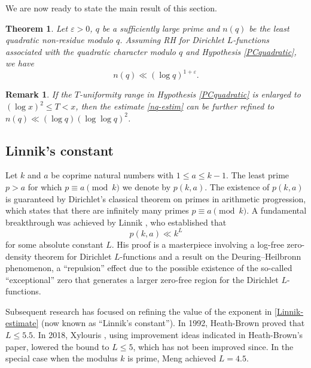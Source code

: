 \documentclass[pdflatex]{sn-jnl}%
\newcommand{\eps}{\ensuremath{\varepsilon}}
\theoremstyle{sltheorems}
\newtheorem{Thm}{Theorem}
\theoremstyle{plainrem}
\newtheorem{Rem}{Remark}
\theoremstyle{definition}
\begin{document}
We are now ready to state the main result of this section. 
%
\begin{Thm}
\label{least-under-pc}
Let $\eps>0$,
$q$ be a sufficiently large prime and 
 $n(q)$ be the least quadratic non-residue modulo $q$.
 Assuming RH for Dirichlet $L$-functions associated with the quadratic
 character modulo $q$  and Hypothesis \ref{PCquadratic}, we have
\begin{equation}
\label{nq-estim}
n(q) \ll (\log q)^{1+\eps}.
\end{equation}
\end{Thm}

\begin{Rem}
If the $T$-uniformity range in Hypothesis \ref{PCquadratic} is enlarged to $(\log x)^2 \le T < x$, then 
the estimate \eqref{nq-estim} can be further refined to $n(q)\ll (\log q) (\log \log q)^2$.
\end{Rem}

\subsection{Linnik's constant}
Let $k$ and $a$ be coprime natural numbers with $1\le a\le k-1$. 
The least prime $p>a$ for which $p\equiv a\pmod{k}$ we denote by $p(k, a)$. The existence of $p(k,a)$ is guaranteed by  Dirichlet's classical theorem on primes in arithmetic progression, which states that there are infinitely many primes $p\equiv a\pmod{k}$.
A fundamental breakthrough was achieved by Linnik \cite{Linnik1944a,Linnik1944b}, who established that
\begin{equation}
\label{Linnik-estimate}
p(k, a) \ll k^{L}
\end{equation}
for some absolute constant $L$.
His proof is a masterpiece involving
a log-free zero-density theorem for Dirichlet $L$-functions
and a result on the Deuring--Heilbronn phenomenon, a ``repulsion'' effect due to 
the possible existence of the so-called ``exceptional'' zero that generates a larger
zero-free region for the Dirichlet $L$-functions.

Subsequent research has focused on refining the value of the exponent in \eqref{Linnik-estimate} (now known as ``Linnik's constant''). 
In 1992, Heath-Brown \cite{HB1992} proved
that $L \le 5.5$. In 2018, Xylouris \cite{Xylouris2011, Xylouris2018}, using improvement ideas indicated in
Heath-Brown's paper, lowered the bound to $L \le 5$, 
which has not been improved since.
 In the special case when the modulus $k$ is prime, Meng \cite{Men00} achieved $L=4.5$.
%
\end{document}
